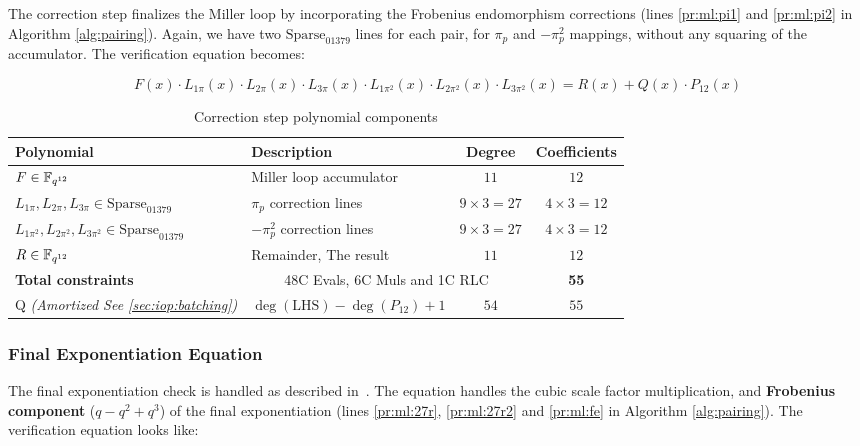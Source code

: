The correction step finalizes the Miller loop by incorporating the Frobenius endomorphism corrections (lines \ref{pr:ml:pi1} and \ref{pr:ml:pi2} in Algorithm \ref{alg:pairing}). Again, we have two $\text{Sparse}_{01379}$ lines for each pair, for $\pi_p$ and $-\pi_p^2$ mappings, without any squaring of the accumulator. The verification equation becomes:

\begin{equation}\label{eq:op:fm}
F(x) \cdot L_{1\pi}(x) \cdot L_{2\pi}(x) \cdot L_{3\pi}(x) \cdot L_{1\pi^2}(x) \cdot L_{2\pi^2}(x) \cdot L_{3\pi^2}(x) = R(x) + Q(x) \cdot P_{12}(x)
\end{equation}

\begin{table}[h]
\centering
\begin{tabular}{|l|l|c|c|}
\hline
\textbf{Polynomial} & \textbf{Description} & \textbf{Degree} & \textbf{Coefficients} \\
\hline
$F \in \mathbb{F}_{q^{12}}$ & Miller loop accumulator & $11$ & $12$ \\
\hline
$L_{1\pi}, L_{2\pi}, L_{3\pi} \in \text{Sparse}_{01379}$ & $\pi_p$ correction lines & $9 \times 3 = 27$ & $4 \times 3 = 12$ \\
\hline
$L_{1\pi^2}, L_{2\pi^2}, L_{3\pi^2} \in \text{Sparse}_{01379}$ & $-\pi_p^2$ correction lines & $9 \times 3 = 27$ & $4 \times 3 = 12$ \\
\hline
$R \in \mathbb{F}_{q^{12}}$ & Remainder, The result & $11$ & $12$ \\
\hline
\textbf{Total constraints} & \multicolumn{2}{|c|}{48C Evals, 6C Muls and 1C RLC} & \textbf{55} \\
\hline
Q \textit{(Amortized See \ref{sec:iop:batching})} & $\deg(\text{LHS}) - \deg(P_{12}) + 1$ & $54$ & $55$ \\
\hline
\end{tabular}
\caption{Correction step polynomial components}\label{tbl:op:ml-frob}
\end{table}

\subsubsection{Final Exponentiation Equation}\label{sec:op:finx}

The final exponentiation check is handled as described in~\cite{OPP24}. The equation handles the cubic scale factor multiplication, and \textbf{Frobenius component} ($q - q^2 + q^3$) of the final exponentiation (lines \ref{pr:ml:27r}, \ref{pr:ml:27r2} and \ref{pr:ml:fe} in Algorithm \ref{alg:pairing}). The verification equation looks like:

